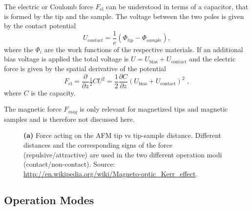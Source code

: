 \documentclass[a4paper]{scrartcl}
\numberwithin{equation}{section}
\numberwithin{figure}{section}
\numberwithin{table}{section}
\begin{document}
The electric or Coulomb force $F_\text{el}$ can be understood in terms of a capacitor, that is formed by the tip and the sample. The voltage between the two poles is given by the contact potential
\begin{equation}
U_{contact}=\frac{1}{e}\left(\Phi_{tip}-\Phi_{sample}\right),
\end{equation}
where the $\Phi_i$ are the work functions of the respective materials. If an additional bias voltage is applied the total voltage is $U=U_\text{bias}+U_\text{contact}$ and the electric force is given by the spatial derivative of the potential 
\begin{equation}
F_\text{el}=\frac{\partial }{\partial z} \tfrac 1 2 C U^2 = \frac{1}{2} \frac{\partial C}{\partial z} (U_\text{bias}+U_\text{contact})^2 \; , \label{eq:elec}
\end{equation}
where $C$ is the capacity.

The magnetic force $F_{mag}$ is only relevant for magnetized tips and magnetic samples and is therefore not discussed here. 

\begin{figure} 
 \centering
{}
\caption{
\small \textbf{(a)} Force acting on the AFM tip vs tip-sample distance. Different distances and the corresponding signs of the force (repulsive/attractive) are used in the two different operation modi (contact/non-contact).
Source: \url{http://en.wikipedia.org/wiki/Magneto-optic_Kerr_effect}. } 
	\label{fig:forces}
\end{figure}

\subsection{Operation Modes}  
\end{document}
